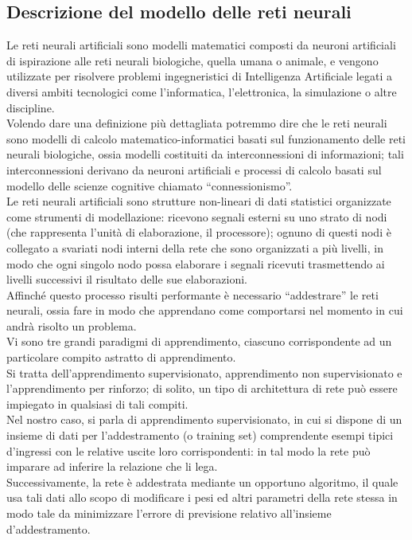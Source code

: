 \subsection{Descrizione del modello delle reti neurali}
Le reti neurali artificiali sono modelli matematici composti da neuroni artificiali di ispirazione alle reti neurali biologiche, quella umana o animale, e vengono utilizzate per risolvere problemi ingegneristici di Intelligenza Artificiale legati a diversi ambiti tecnologici come l’informatica, l’elettronica, la simulazione o altre discipline.\\
Volendo dare una definizione più dettagliata potremmo dire che le reti neurali sono modelli di calcolo matematico-informatici basati sul funzionamento delle reti neurali biologiche, ossia modelli costituiti da interconnessioni di informazioni; tali interconnessioni derivano da neuroni artificiali e processi di calcolo basati sul modello delle scienze cognitive chiamato “connessionismo”.\\
Le reti neurali artificiali sono strutture non-lineari di dati statistici organizzate come strumenti di modellazione: ricevono segnali esterni su uno strato di nodi (che rappresenta l’unità di elaborazione, il processore); ognuno di questi nodi è collegato a svariati nodi interni della rete che sono organizzati a più livelli, in modo che ogni singolo nodo possa elaborare i segnali ricevuti trasmettendo ai livelli successivi il risultato delle sue elaborazioni.\\
Affinché questo processo risulti performante è necessario “addestrare” le reti neurali, ossia fare in modo che apprendano come comportarsi nel momento in cui andrà risolto un problema.\\
Vi sono tre grandi paradigmi di apprendimento, ciascuno corrispondente ad un particolare compito astratto di apprendimento. \\
Si tratta dell'apprendimento supervisionato, apprendimento non supervisionato e l'apprendimento per rinforzo; di solito, un tipo di architettura di rete può essere impiegato in qualsiasi di tali compiti.\\
Nel nostro caso, si parla di apprendimento supervisionato, in cui si dispone di un insieme di dati per l'addestramento (o training set) comprendente esempi tipici d'ingressi con le relative uscite loro corrispondenti: in tal modo la rete può imparare ad inferire la relazione che li lega. \\ 
Successivamente, la rete è addestrata mediante un opportuno algoritmo, il quale usa tali dati allo scopo di modificare i pesi ed altri parametri della rete stessa in modo tale da minimizzare l'errore di previsione relativo all'insieme d'addestramento.\\
